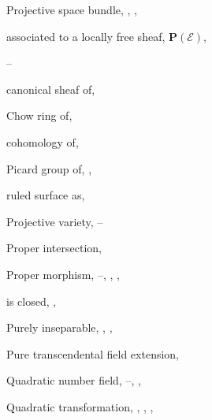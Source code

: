 {{\noindent\hspace*{0.0bp}Projective space bundle, , , \par
\noindent\hspace*{7.5bp}associated to a locally free sheaf, $\mathbf P(\mathcal E)$,\par
\noindent\hspace*{15.0bp}--\par
\noindent\hspace*{7.5bp}canonical sheaf of, \par
\noindent\hspace*{7.5bp}Chow ring of, \par
\noindent\hspace*{7.5bp}cohomology of, \par
\noindent\hspace*{7.5bp}Picard group of, , \par
\noindent\hspace*{7.5bp}ruled surface as, \par
\noindent\hspace*{0.0bp}Projective variety, --\par
\noindent\hspace*{0.0bp}Proper intersection, \par
\noindent\hspace*{0.0bp}Proper morphism, --, , , \par
\noindent\hspace*{7.5bp}is closed, , \par
\noindent\hspace*{0.0bp}Purely inseparable, , , \par
\noindent\hspace*{0.0bp}Pure transcendental field extension, \par
\vspace{8.55bp}
\noindent\hspace*{0.0bp}Quadratic number field, --, , \par
\noindent\hspace*{0.0bp}Quadratic transformation, , , , \par
}}

